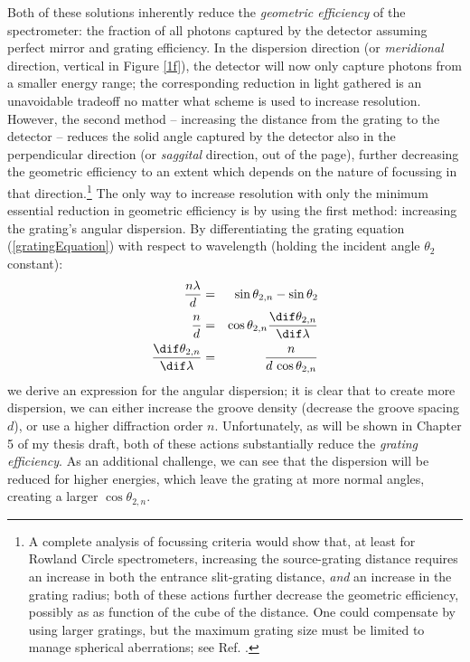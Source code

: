 Both of these solutions inherently reduce the \emph{geometric efficiency} of the spectrometer: the fraction of all photons captured by the detector assuming perfect mirror and grating efficiency.  In the dispersion direction (or \emph{meridional} direction, vertical in Figure \ref{1f}), the detector will now only capture photons from a smaller energy range; the corresponding reduction in light gathered is an unavoidable tradeoff no matter what scheme is used to increase  resolution.  However, the second method -- increasing the distance from the grating to the detector --  reduces the solid angle captured by the detector also in the perpendicular direction (or \emph{saggital} direction, out of the page), further decreasing the geometric efficiency to an extent which depends on the nature of focussing in that direction.\footnote{A complete analysis of focussing criteria would show that, at least for Rowland Circle spectrometers, increasing the source-grating distance requires an increase in both the entrance slit-grating distance, \emph{and} an increase in the grating radius; both of these actions further decrease the geometric efficiency, possibly as as function of the cube of the distance.  One could compensate by using larger gratings, but the maximum grating size must be limited to manage spherical aberrations; see Ref. \cite[p.~98]{Mui06}.}  The only way to increase resolution with only the minimum essential reduction in geometric efficiency is by using the first method: increasing the grating's angular dispersion.  By differentiating the grating equation (\ref{gratingEquation}) with respect to wavelength (holding the incident angle $\theta_{2}$ constant):
\begin{eqnarray}
\frac{n\lambda}{d} &=& \sin\theta_{2,n} - \sin\theta_{2} \\
\frac{n}{d} &=& \cos \theta_{2,n} \frac{\dif \theta_{2,n}}{\dif \lambda} \\
\frac{\dif \theta_{2,n}}{\dif \lambda} &=& \frac{n}{d\, \cos \theta_{2,n}}
\label{angularDispersionEqn}
\end{eqnarray}
we derive an expression for the angular dispersion; it is clear that to create more dispersion, we can either increase the groove density (decrease the groove spacing $d$), or use a higher diffraction order $n$.  Unfortunately, as will be shown in Chapter 5 of my thesis draft, both of these actions substantially reduce the \emph{grating efficiency}.  As an additional challenge, we can see that the dispersion will be reduced for higher energies, which leave the grating at more normal angles, creating a larger $\cos \theta_{2,n}$.


